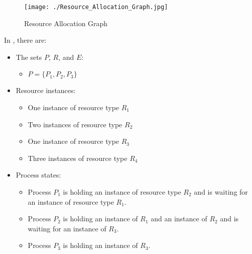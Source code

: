 \begin{figure}[h!tbp]
  \centering
  \texttt{[image: ./Resource\_Allocation\_Graph.jpg]}
  \caption{Resource Allocation Graph}
  \label{fig:Resource_Allocation_Graph}
\end{figure}

In , there are:
\begin{itemize}[noitemsep]
\item The sets $P$, $R$, and $E$:
  \begin{itemize}[noitemsep]
  \item $P = \lbrace P_{1}, P_{2}, P_{3} \rbrace$
  \end{itemize}

\item Resource instances:
  \begin{itemize}[noitemsep]
  \item One instance of resource type $R_{1}$
  \item Two instances of resource type $R_{2}$
  \item One instance of resource type $R_{3}$
  \item Three instances of resource type $R_{4}$
  \end{itemize}

\item Process states:
  \begin{itemize}[noitemsep]
  \item Process $P_{1}$ is holding an instance of resource type $R_{2}$ and is waiting for an instance of resource type $R_{1}$.
  \item Process $P_{2}$ is holding an instance of $R_{1}$ and an instance of $R_{2}$ and is waiting for an instance of $R_{3}$.
  \item Process $P_{3}$ is holding an instance of $R_{3}$.
  \end{itemize}
\end{itemize}

